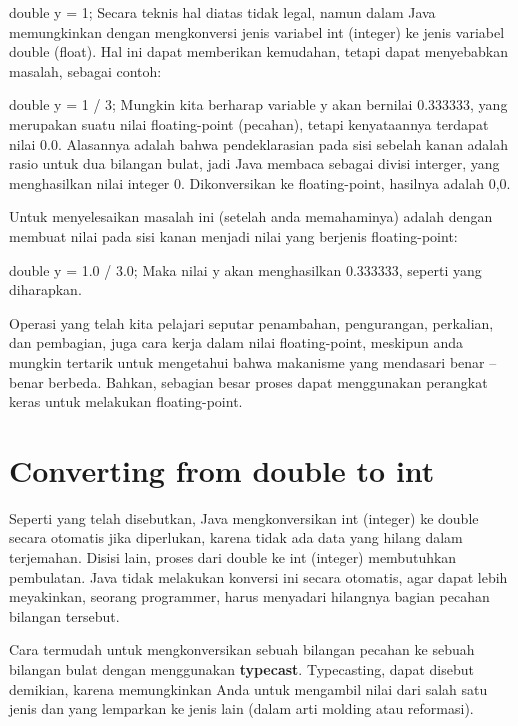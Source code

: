 	double y = 1;\newline \newline
Secara teknis hal diatas tidak legal, namun dalam Java memungkinkan dengan mengkonversi jenis variabel int (integer) ke jenis variabel double (float). Hal ini dapat memberikan kemudahan, tetapi dapat menyebabkan masalah, sebagai contoh:\newline

	double y = 1 / 3;\newline \newline
Mungkin kita berharap variable y akan bernilai 0.333333, yang merupakan suatu nilai floating-point (pecahan), tetapi kenyataannya terdapat nilai 0.0. Alasannya adalah bahwa pendeklarasian pada sisi sebelah kanan adalah rasio untuk dua bilangan bulat, jadi Java membaca sebagai divisi interger, yang menghasilkan nilai integer 0. Dikonversikan ke floating-point, hasilnya adalah 0,0.

Untuk menyelesaikan masalah ini (setelah anda memahaminya) adalah dengan membuat nilai pada sisi kanan menjadi nilai yang berjenis floating-point:\newline

	double y = 1.0 / 3.0;\newline \newline
Maka nilai y akan menghasilkan 0.333333, seperti yang diharapkan.

Operasi yang telah kita pelajari seputar penambahan, pengurangan, perkalian, dan pembagian, juga cara kerja dalam nilai floating-point, meskipun anda mungkin tertarik untuk mengetahui bahwa makanisme yang mendasari benar – benar berbeda. Bahkan, sebagian besar proses dapat menggunakan perangkat keras untuk melakukan floating-point.

\section{Converting from double to int}
Seperti yang telah disebutkan, Java mengkonversikan int (integer) ke double secara otomatis jika diperlukan, karena tidak ada data yang hilang dalam terjemahan. Disisi lain, proses dari double ke int (integer) membutuhkan pembulatan. Java tidak melakukan konversi ini secara otomatis, agar dapat lebih meyakinkan, seorang programmer, harus menyadari hilangnya bagian pecahan bilangan tersebut.

Cara termudah untuk mengkonversikan sebuah bilangan pecahan ke sebuah bilangan bulat dengan menggunakan \textbf{typecast}. Typecasting, dapat disebut demikian, karena memungkinkan Anda untuk mengambil nilai dari salah satu jenis dan yang lemparkan ke jenis lain (dalam arti molding atau reformasi).

